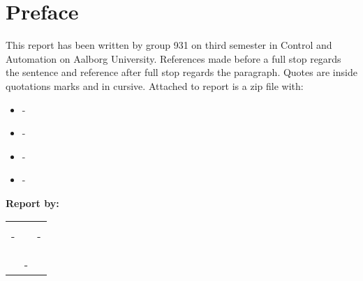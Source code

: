 \chapter*{Preface}
This report has been written by group 931 on third semester in Control and Automation on Aalborg University.
References made before a full stop regards the sentence and reference after full stop regards the paragraph. Quotes are inside quotations marks and in cursive.
Attached to report is a zip file with:
\begin{itemize}
	\item -
	\item -
	\item -
	\item -
\end{itemize}
\vspace{2cm}

\textbf{Report by:}\\
\vspace{-5pt}
\begin{table}[H]
	\centering
	\begin{tabular}{c c c}
		\underline{\phantom{JAERJAERJAERJAERGO}} & \phantom{cookies} & \underline{\phantom{JAERJAERJAERJAERGO}} \\
		-		& \phantom{cookies} &  -		\\
		&&\\
		\multicolumn{3}{c}{\underline{\phantom{JAERJAERJAERJAERGO}}}\\
		\multicolumn{3}{c}{- }\\				
						
	\end{tabular}
\end{table}


\pagebreak
